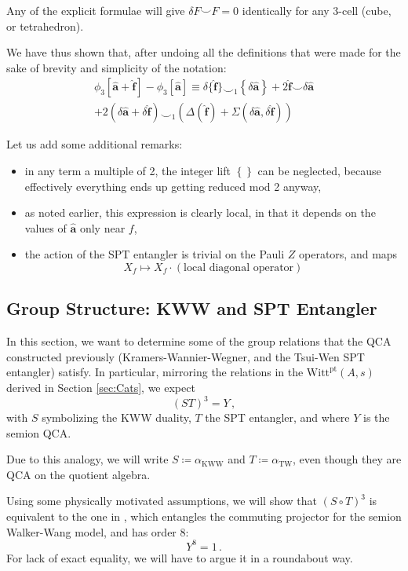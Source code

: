 \documentclass[aps,twocolumn,prx,floatfix,preprintnumbers, nofootinbib,10pt]{revtex4-2}
\numberwithin{equation}{section}
\theoremstyle{definition}
\theoremstyle{remark}
\theoremstyle{claim}
\newcommand{\be}{\begin{equation}}
\newcommand{\ee}{\end{equation}}
\newcommand{\KWW}{\text{KWW}}
\newcommand{\TW}{\text{TW}}
\newcommand{\lbbb}{\left\{}
\newcommand{\rbbb}{\right\}}
\newcommand{\lrb}[1]{\lbbb #1 \rbbb}
\newcommand{\Witt}{\text{Witt}}
\newcommand{\pt}{\text{pt}}
\begin{document}
Any of the explicit formulae will give $\delta F \smile F = 0$ identically for any 3-cell (cube, or tetrahedron).

We have thus shown that, after undoing all the definitions that were made for the sake of brevity and simplicity of the notation:
\begin{multline}
 \phi_3[\bm{\hat{a}}+\bm{\hat{f}}]-\phi_3[\bm{\hat{a}}] 
 \equiv \delta{\{\bm{\hat{f}}}\}\smile_1 \lrb{\delta \bm{\hat{a}}} + 2 \bm{\hat{f}} \smile \delta \bm{\hat{a}} \\
 + 2 \left( \delta{\bm{\hat{a}}}+\delta{\bm{\hat{f}}} \right) \smile_1 \left( \Delta(\bm{\hat{f}})+\Sigma(\delta{\bm{\hat{a}}},\delta{\bm{\hat{f}}}) \right)
\end{multline}

Let us add some additional remarks:
\begin{itemize}
 \item in any term a multiple of 2, the integer lift $\lrb{}$ can be neglected, because effectively everything ends up getting reduced mod 2 anyway,

 \item as noted earlier, this expression is clearly local, in that it depends on the values of $\bm{\hat{a}}$ only near $f$,

 \item the action of the SPT entangler is trivial on the Pauli $Z$ operators, and maps
 \be
 X_f \mapsto X_f \cdot (\text{local diagonal operator})
 \ee
\end{itemize}

\subsection{Group Structure: KWW and SPT Entangler}


In this section, we want to determine some of the group relations that the QCA constructed previously (Kramers-Wannier-Wegner, and the Tsui-Wen SPT entangler) satisfy.
In particular, mirroring the relations in the $\Witt^\pt (A,s)$ derived in Section \ref{sec:Cats}, we expect
\be
(ST)^3 = Y \,,
\ee
with $S$ symbolizing the KWW duality, $T$ the SPT entangler, and where $Y$ is the semion QCA.

Due to this analogy, we will write $S \coloneqq \alpha_\KWW$ and $T \coloneqq \alpha_\TW$, even though they are QCA on the quotient algebra.


Using some physically motivated assumptions, we will show that $(S \circ T)^3$ is equivalent to the one in  \cite{Shirley_2022}, which entangles the commuting projector for the semion Walker-Wang model, and has order 8: 
\be
Y^8=1 \,.
\ee
For lack of exact equality, we will have to argue it in a roundabout way.
\end{document}
